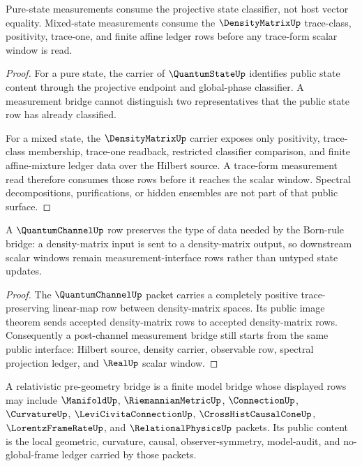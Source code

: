 \begin{corollary}
\label{cor:philosophy-phase-density-boundaries}
Pure-state measurements consume the projective state classifier, not host
vector equality. Mixed-state measurements consume the $\DensityMatrixUp$
trace-class, positivity, trace-one, and finite affine ledger rows before any
trace-form scalar window is read.
\end{corollary}
\begin{proof}
For a pure state, the carrier of $\QuantumStateUp$ identifies public state
content through the projective endpoint and global-phase classifier. A
measurement bridge cannot distinguish two representatives that the public
state row has already classified.

For a mixed state, the $\DensityMatrixUp$ carrier exposes only positivity,
trace-class membership, trace-one readback, restricted classifier comparison,
and finite affine-mixture ledger data over the Hilbert source. A trace-form
measurement read therefore consumes those rows before it reaches the scalar
window. Spectral decompositions, purifications, or hidden ensembles are not
part of that public surface.
\end{proof}

\begin{corollary}
\label{cor:philosophy-quantum-channel-preserves-measurement-interface}
A $\QuantumChannelUp$ row preserves the type of data needed by the
Born-rule bridge: a density-matrix input is sent to a density-matrix output,
so downstream scalar windows remain measurement-interface rows rather than
untyped state updates.
\end{corollary}
\begin{proof}
The $\QuantumChannelUp$ packet carries a completely positive trace-preserving
linear-map row between density-matrix spaces. Its public image theorem sends
accepted density-matrix rows to accepted density-matrix rows. Consequently a
post-channel measurement bridge still starts from the same public interface:
Hilbert source, density carrier, observable row, spectral projection ledger,
and $\RealUp$ scalar window.
\end{proof}

\begin{definition}
\label{def:philosophy-relativistic-pre-geometry-bridge}
A relativistic pre-geometry bridge is a finite model bridge whose displayed
rows may include $\ManifoldUp$, $\RiemannianMetricUp$, $\ConnectionUp$,
$\CurvatureUp$, $\LeviCivitaConnectionUp$, $\CrossHistCausalConeUp$,
$\LorentzFrameRateUp$, and $\RelationalPhysicsUp$ packets. Its public content
is the local geometric, curvature, causal, observer-symmetry, model-audit, and
no-global-frame ledger carried by those packets.
\end{definition}

